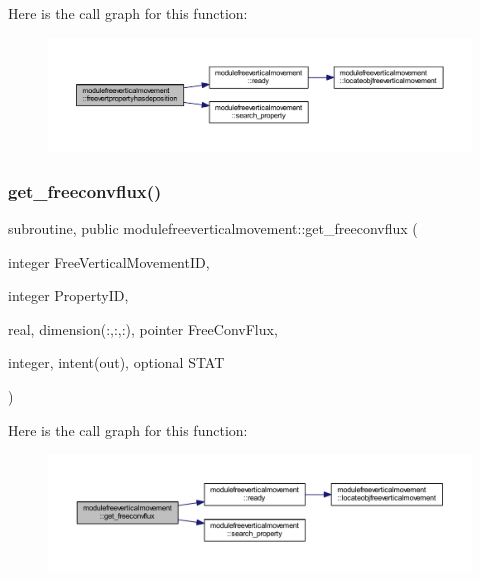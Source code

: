 Here is the call graph for this function\+:\nopagebreak
\begin{figure}[H]
\begin{center}
\leavevmode
\includegraphics[width=350pt]{namespacemodulefreeverticalmovement_a5df00d9a684664131c8c007872e866a8_cgraph}
\end{center}
\end{figure}
\mbox{\label{namespacemodulefreeverticalmovement_ae2c2c24a260e587fdae043cc60422788}} 
\subsubsection{\texorpdfstring{get\+\_\+freeconvflux()}{get\_freeconvflux()}}
{\footnotesize\ttfamily subroutine, public modulefreeverticalmovement\+::get\+\_\+freeconvflux (\begin{DoxyParamCaption}\item[{integer}]{Free\+Vertical\+Movement\+ID,  }\item[{integer}]{Property\+ID,  }\item[{real, dimension(\+:,\+:,\+:), pointer}]{Free\+Conv\+Flux,  }\item[{integer, intent(out), optional}]{S\+T\+AT }\end{DoxyParamCaption})}

Here is the call graph for this function\+:\nopagebreak
\begin{figure}[H]
\begin{center}
\leavevmode
\includegraphics[width=350pt]{namespacemodulefreeverticalmovement_ae2c2c24a260e587fdae043cc60422788_cgraph}
\end{center}
\end{figure}
\mbox{\label{namespacemodulefreeverticalmovement_ae1df1a4ce293addb56cc6c44759de660}} 

